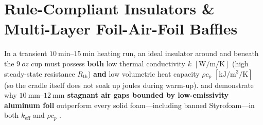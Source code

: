 \section{Rule-Compliant Insulators \& Multi-Layer Foil-Air-Foil Baffles}\label{sec:14.5}

In a transient $\SIrange{10}{15}{\minute}$ heating run, an ideal insulator around and beneath the $\SI{9}{oz}$ cup must possess \textbf{both} low thermal conductivity $k$ $[\si{\watt\per\meter\per\kelvin}]$ (high steady-state resistance $R_{\mathrm{th}}$) \textbf{and} low volumetric heat capacity $\rho c_p$ $[\si{\kilo\joule\per\cubic\meter\per\kelvin}]$ (so the cradle itself does not soak up joules during warm-up).  and  demonstrate why \textbf{$\SIrange{10}{12}{\milli\meter}$ stagnant air gaps bounded by low-emissivity aluminum foil} outperform every solid foam—including banned Styrofoam—in both $k_{\mathrm{eff}}$ and $\rho c_p$ .

